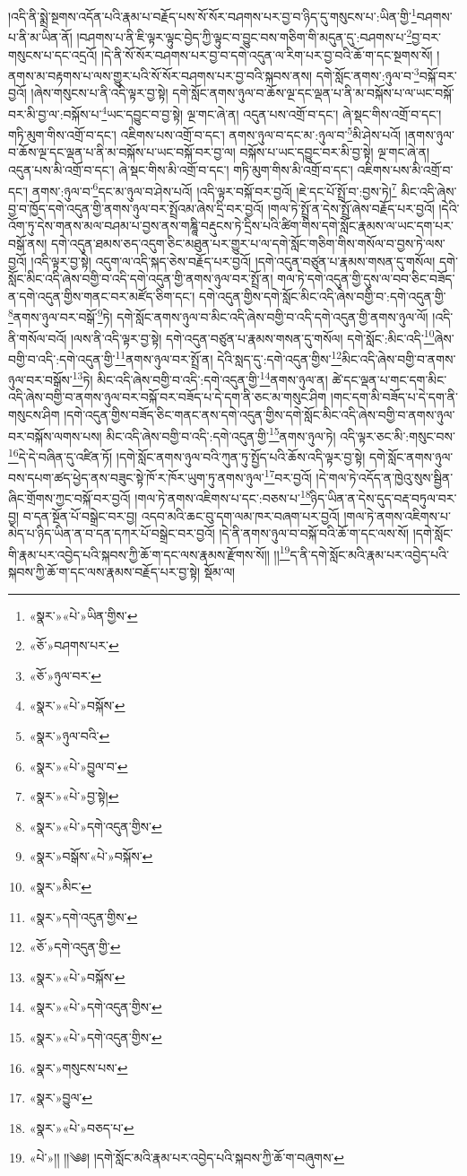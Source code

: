 །འདི་ནི་སྨྲེ་སྔགས་འདོན་པའི་རྣམ་པ་བརྗོད་པས་སོ་སོར་བཤགས་པར་བྱ་བ་ཉིད་དུ་གསུངས་པ་:ཡིན་གྱི་\footnote{«སྣར་»«པེ་»ཡིན་གྱིས་}བཤགས་པ་ནི་མ་ཡིན་ནོ། །བཤགས་པ་ནི་ཇི་ལྟར་ལྟུང་བྱེད་ཀྱི་ལྟུང་བ་བྱུང་བས་གཅིག་གི་མདུན་དུ་:བཤགས་པ་\footnote{«ཅོ་»བཤགས་པར་}བྱ་བར་གསུངས་པ་དང་འདྲའོ། །དེ་ནི་སོ་སོར་བཤགས་པར་བྱ་བ་དགེ་འདུན་ལ་རིག་པར་བྱ་བའི་ཆོ་ག་དང་སྔགས་སོ། །ནགས་མ་བརྟགས་པ་ལས་གྱུར་པའི་སོ་སོར་བཤགས་པར་བྱ་བའི་སྐབས་ནས། དགེ་སློང་ནགས་:ཉུལ་བ་\footnote{«ཅོ་»ཉུལ་བར་}བསྐོ་བར་བྱའོ། །ཞེས་གསུངས་པ་ནི་འདི་ལྟར་བྱ་སྟེ། དགེ་སློང་ནགས་ཉུལ་བ་ཆོས་ལྔ་དང་ལྡན་པ་ནི་མ་བསྐོས་པ་ལ་ཡང་བསྐོ་བར་མི་བྱ་ལ་:བསྐོས་པ་\footnote{«སྣར་»«པེ་»བསྐོས་}ཡང་དབྱུང་བ་བྱ་སྟེ། ལྔ་གང་ཞེ་ན། འདུན་པས་འགྲོ་བ་དང་། ཞེ་སྡང་གིས་འགྲོ་བ་དང་། གཏི་མུག་གིས་འགྲོ་བ་དང་། འཇིགས་པས་འགྲོ་བ་དང་། ནགས་ཉུལ་བ་དང་མ་:ཉུལ་བ་\footnote{«སྣར་»ཉུལ་བའི་}མི་ཤེས་པའོ། །ནགས་ཉུལ་བ་ཆོས་ལྔ་དང་ལྡན་པ་ནི་མ་བསྐོས་པ་ཡང་བསྐོ་བར་བྱ་ལ། བསྐོས་པ་ཡང་དབྱུང་བར་མི་བྱ་སྟེ། ལྔ་གང་ཞེ་ན། འདུན་པས་མི་འགྲོ་བ་དང་། ཞེ་སྡང་གིས་མི་འགྲོ་བ་དང་། གཏི་མུག་གིས་མི་འགྲོ་བ་དང་། འཇིགས་པས་མི་འགྲོ་བ་དང་། ནགས་:ཉུལ་བ་\footnote{«སྣར་»«པེ་»བྱུལ་བ་}དང་མ་ཉུལ་བ་ཤེས་པའོ། །འདི་ལྟར་བསྐོ་བར་བྱའོ། །ཇེ་དང་པོ་སྤྲོ་བ་:བྱས་ཏེ།\footnote{«སྣར་»«པེ་»བྱ་སྟེ།} མིང་འདི་ཞེས་བྱ་བ་ཁྱོད་དགེ་འདུན་གྱི་ནགས་ཉུལ་བར་སྤྲོའམ་ཞེས་དྲི་བར་བྱའོ། །གལ་ཏེ་སྤྲོ་ན་དེས་སྤྲོ་ཞེས་བརྗོད་པར་བྱའོ། །དེའི་འོག་ཏུ་དེས་གནས་མལ་བཤམ་པ་བྱས་ནས་གཎྜཱི་བརྡུངས་ཏེ་དྲིས་པའི་ཚིག་གིས་དགེ་སློང་རྣམས་ལ་ཡང་དག་པར་བསྒོ་ནས། དགེ་འདུན་ཐམས་ཅད་འདུག་ཅིང་མཐུན་པར་གྱུར་པ་ལ་དགེ་སློང་གཅིག་གིས་གསོལ་བ་བྱས་ཏེ་ལས་བྱའོ། །འདི་ལྟར་བྱ་སྟེ། འདུག་ལ་འདི་སྐད་ཅེས་བརྗོད་པར་བྱའོ། །དགེ་འདུན་བཙུན་པ་རྣམས་གསན་དུ་གསོལ། དགེ་སློང་མིང་འདི་ཞེས་བགྱི་བ་འདི་དགེ་འདུན་གྱི་ནགས་ཉུལ་བར་སྤྲོ་ན། གལ་ཏེ་དགེ་འདུན་གྱི་དུས་ལ་བབ་ཅིང་བཟོད་ན་དགེ་འདུན་གྱིས་གནང་བར་མཛོད་ཅིག་དང་། དགེ་འདུན་གྱིས་དགེ་སློང་མིང་འདི་ཞེས་བགྱི་བ་:དགེ་འདུན་གྱི་\footnote{«སྣར་»«པེ་»དགེ་འདུན་གྱིས་}ནགས་ཉུལ་བར་བསྒོ་\footnote{«སྣར་»བསྒོས་«པེ་»བསྐོས་}ཏེ། དགེ་སློང་ནགས་ཉུལ་བ་མིང་འདི་ཞེས་བགྱི་བ་འདི་དགེ་འདུན་གྱི་ནགས་ཉུལ་ལོ། །འདི་ནི་གསོལ་བའོ། །ལས་ནི་འདི་ལྟར་བྱ་སྟེ། དགེ་འདུན་བཙུན་པ་རྣམས་གསན་དུ་གསོལ། དགེ་སློང་:མིང་འདི་\footnote{«སྣར་»མིང་}ཞེས་བགྱི་བ་འདི་:དགེ་འདུན་གྱི་\footnote{«སྣར་»དགེ་འདུན་གྱིས་}ནགས་ཉུལ་བར་སྤྲོ་ན། དེའི་སླད་དུ་:དགེ་འདུན་གྱིས་\footnote{«ཅོ་»དགེ་འདུན་གྱི་}མིང་འདི་ཞེས་བགྱི་བ་ནགས་ཉུལ་བར་བསྒོས་\footnote{«སྣར་»«པེ་»བསྐོས་}ཏེ། མིང་འདི་ཞེས་བགྱི་བ་འདི་:དགེ་འདུན་གྱི་\footnote{«སྣར་»«པེ་»དགེ་འདུན་གྱིས་}ནགས་ཉུལ་ན། ཚེ་དང་ལྡན་པ་གང་དག་མིང་འདི་ཞེས་བགྱི་བ་ནགས་ཉུལ་བར་བསྐོ་བར་བཟོད་པ་དེ་དག་ནི་ཅང་མ་གསུང་ཤིག །གང་དག་མི་བཟོད་པ་དེ་དག་ནི་གསུངས་ཤིག །དགེ་འདུན་གྱིས་བཟོད་ཅིང་གནང་ནས་དགེ་འདུན་གྱིས་དགེ་སློང་མིང་འདི་ཞེས་བགྱི་བ་ནགས་ཉུལ་བར་བསྐོས་ལགས་པས། མིང་འདི་ཞེས་བགྱི་བ་འདི་:དགེ་འདུན་གྱི་\footnote{«སྣར་»«པེ་»དགེ་འདུན་གྱིས་}ནགས་ཉུལ་ཏེ། འདི་ལྟར་ཅང་མི་:གསུང་བས་\footnote{«སྣར་»གསུངས་པས་}དེ་དེ་བཞིན་དུ་འཛིན་ཏོ། །དགེ་སློང་ནགས་ཉུལ་བའི་ཀུན་ཏུ་སྤྱོད་པའི་ཆོས་འདི་ལྟར་བྱ་སྟེ། དགེ་སློང་ནགས་ཉུལ་བས་དཔག་ཚད་ཕྱེད་ནས་བཟུང་སྟེ་ཁོ་ར་ཁོར་ཡུག་ཏུ་ནགས་ཉུལ་\footnote{«སྣར་»བྱུལ་}བར་བྱའོ། །དེ་གལ་ཏེ་འདོད་ན་ཁྱེའུ་སུས་སྦྱིན་ཞིང་གྲོགས་ཀྱང་བསྐོ་བར་བྱའོ། །གལ་ཏེ་ནགས་འཇིགས་པ་དང་:བཅས་པ་\footnote{«སྣར་»«པེ་»བཅད་པ་}ཉིད་ཡིན་ན་དེས་དུད་བརྡ་བཏུལ་བར་བྱ། བ་དན་སྔོན་པོ་བསྒྲེང་བར་བྱ། འདབ་མའི་ཆང་བུ་དག་ལམ་ཁར་བཞག་པར་བྱའོ། །གལ་ཏེ་ནགས་འཇིགས་པ་མེད་པ་ཉིད་ཡིན་ན་བ་དན་དཀར་པོ་བསྒྲེང་བར་བྱའོ། །དེ་ནི་ནགས་ཉུལ་བ་བསྐོ་བའི་ཆོ་ག་དང་ལས་སོ། །དགེ་སློང་གི་རྣམ་པར་འབྱེད་པའི་སྐབས་ཀྱི་ཆོ་ག་དང་ལས་རྣམས་རྫོགས་སོ།། །།\footnote{«པེ་»།། །།༄༅། །དགེ་སློང་མའི་རྣམ་པར་འབྱེད་པའི་སྐབས་ཀྱི་ཆོ་ག་བཞུགས་}ད་ནི་དགེ་སློང་མའི་རྣམ་པར་འབྱེད་པའི་སྐབས་ཀྱི་ཆོ་ག་དང་ལས་རྣམས་བརྗོད་པར་བྱ་སྟེ། སྡོམ་ལ། 